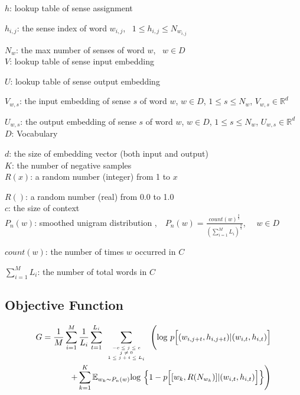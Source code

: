 \documentclass[12pt,a4paper,twoside]{book}
\begin{document}
$h$: lookup table of sense assignment

$h_{i,j}$: the sense index of word $w_{i,j}$, \ $1\leq h_{i,j}\leq N_{w_{i,j}}$

$N_w$: the max number of senses of word $w$, \ $w\in D$\\

$V$: lookup table of sense input embedding 

$U$: lookup table of  sense output embedding 

$V_{w,s}$: the input embedding of sense $s$ of word $w$, $w\in D$, $1\leq s\leq N_w$, $V_{w,s} \in \mathbb{R}^d$

$U_{w,s}$: the output embedding of sense $s$ of word $w$, $w\in D$, $1\leq s\leq N_w$, $U_{w,s} \in \mathbb{R}^d$\\

$D$: Vocabulary 

$d$: the size of embedding vector (both input and output)\\

$K$: the number of negative samples\\

$R(x)$: a random number (integer) from 1 to $x$

$R()$: a random number (real) from 0.0 to 1.0\\

$c$: the size of context\\

$P_n(w)$: smoothed unigram distribution ,\ \ $P_n(w) = \frac{count(w)^{\frac{3}{4}}}{(\sum_{i=1}^M L_i)^{\frac{3}{4}}}$, \ \ $w\in D$

$count(w)$: the number of times $w$ occurred in $C$

$\sum_{i=1}^M L_i$: the number of total words in $C$

\subsection{Objective Function}
\begin{equation}
\begin{split}
G = \frac{1}{M}\sum_{i=1}^M\frac{1}{L_i}\sum_{t=1}^{L_i}\sum\limits_{\mbox{\tiny$\begin{array}{c}-c\leq j \leq c\\ j\neq 0\\ 1\leq j+t\leq L_i\end{array}$}}\Bigg (\mathrm{log}\ p\Big [(w_{i,j+t},h_{i,j+t})|(w_{i,t},h_{i,t})\Big ] \\
+\sum\limits_{k=1}^K\mathbb{E}_{w_k\sim P_n(w)}\mathrm{log}\ \Big \{1-p\Big[[w_k,R(N_{w_k})]|(w_{i,t},h_{i,t})\Big ] \Big \} \Bigg )
\end{split}
\end{equation} 
\end{document}
